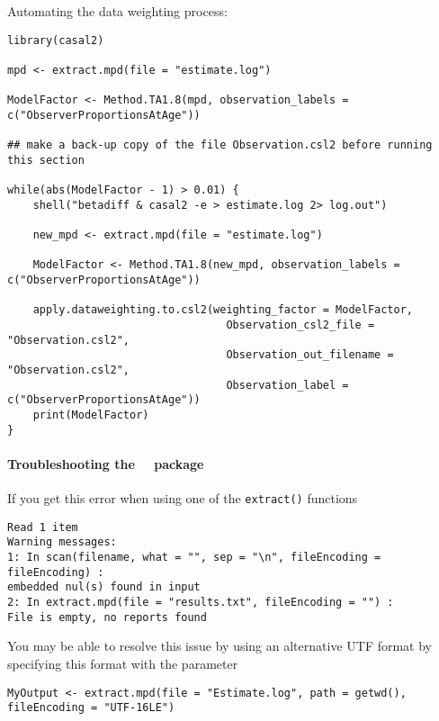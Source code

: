 Automating the data weighting process:

\begin{lstlisting}
library(casal2)

mpd <- extract.mpd(file = "estimate.log")

ModelFactor <- Method.TA1.8(mpd, observation_labels = c("ObserverProportionsAtAge"))

## make a back-up copy of the file Observation.csl2 before running this section

while(abs(ModelFactor - 1) > 0.01) {
	shell("betadiff & casal2 -e > estimate.log 2> log.out")

	new_mpd <- extract.mpd(file = "estimate.log")

	ModelFactor <- Method.TA1.8(new_mpd, observation_labels = c("ObserverProportionsAtAge"))

	apply.dataweighting.to.csl2(weighting_factor = ModelFactor,
                                  Observation_csl2_file = "Observation.csl2",
                                  Observation_out_filename = "Observation.csl2",
                                  Observation_label = c("ObserverProportionsAtAge"))
	print(ModelFactor)
}
\end{lstlisting}

\paragraph*{Troubleshooting the \cname\ \R\ package}

If you get this error when using one of the \texttt{extract()} functions

\begin{lstlisting}
Read 1 item
Warning messages:
1: In scan(filename, what = "", sep = "\n", fileEncoding = fileEncoding) :
embedded nul(s) found in input
2: In extract.mpd(file = "results.txt", fileEncoding = "") :
File is empty, no reports found
\end{lstlisting}

You may be able to resolve this issue by using an alternative UTF format by specifying this format with the  parameter

\begin{lstlisting}
MyOutput <- extract.mpd(file = "Estimate.log", path = getwd(), fileEncoding = "UTF-16LE")
\end{lstlisting}
